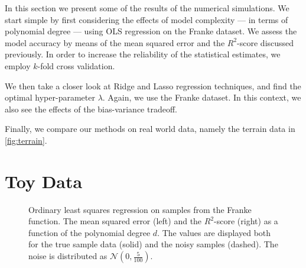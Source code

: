 \documentclass[dvipsnames, article, a4paper, oneside, 12pt]{memoir}
\newcommand{\N}{\mathcal{N}}
\begin{document}
  In this section we present some of the results of the numerical simulations.
  We start simple by first considering the effects of model complexity --- in
  terms of polynomial degree --- using OLS regression on the Franke dataset. We
  assess the model accuracy by means of the mean squared error and the \(
  R^2\)-score discussed previously. In order to increase the reliability of the
  statistical estimates, we employ \( k\)-fold cross validation.

  We then take a closer look at Ridge and Lasso regression techniques, and find
  the optimal hyper-parameter \( \lambda \). Again, we use the Franke dataset.
  In this context, we also see the effects of the bias-variance tradeoff.

  Finally, we compare our methods on real world data, namely the terrain data
  in \cref{fig:terrain}.
  
  \section{Toy Data}
  
  \begin{figure}
    \centering
    \caption{Ordinary least squares regression on samples from the Franke
      function. The mean squared error (left) and the \(R^2\)-score (right) as
      a function of the polynomial degree \( d \). The values are displayed
      both for the true sample data (solid) and the noisy samples (dashed). The
      noise is distributed as \( \N(0, \tfrac{5}{100})\).}
    \label{fig:ols_scores}
  \end{figure}
\end{document}
